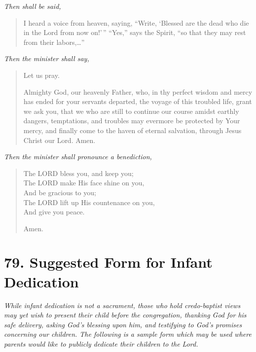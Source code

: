 \documentclass[
]{book}
\begin{document}
\emph{Then shall be said,}

\begin{quote}
I heard a voice from heaven, saying, ``Write, `Blessed are the dead who die in the Lord from now on!'\,'' ``Yes,'' says the Spirit, ``so that they may rest from their labors,\ldots{}''
\end{quote}

\emph{Then the minister shall say,}

\begin{quote}
Let us pray.

Almighty God, our heavenly Father, who, in thy perfect wisdom and mercy has ended for your servants departed, the voyage of this troubled life, grant we ask you, that we who are still to continue our course amidst earthly dangers, temptations, and troubles may evermore be protected by Your mercy, and finally come to the haven of eternal salvation, through Jesus Christ our Lord. Amen.
\end{quote}

\emph{Then the minister shall pronounce a benediction,}

\begin{quote}
The LORD bless you, and keep you;\\
The LORD make His face shine on you,\\
And be gracious to you;\\
The LORD lift up His countenance on you,\\
And give you peace.

Amen.
\end{quote}

\hypertarget{suggested-form-for-infant-dedication}{%
\section*{79. Suggested Form for Infant Dedication}\label{suggested-form-for-infant-dedication}}

\protect\hypertarget{chapter-slug-79-suggested-form-for-infant-dedication}{\href{}{}}

\protect\hypertarget{79}{\href{}{}}\emph{While infant dedication is not a sacrament, those who hold credo-baptist views may yet wish to present their child before the congregation, thanking God for his safe delivery, asking God's blessing upon him, and testifying to God's promises concerning our children. The following is a sample form which may be used where parents would like to publicly dedicate their children to the Lord.}
\end{document}

